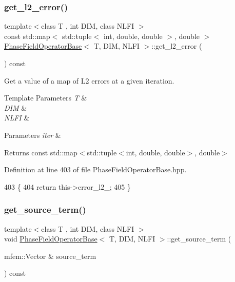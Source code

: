 \subsubsection{\texorpdfstring{get\+\_\+l2\+\_\+error()}{get\_l2\_error()}}
{\footnotesize\ttfamily template$<$class T , int D\+IM, class N\+L\+FI $>$ \\
const std\+::map$<$ std\+::tuple$<$ int, double, double $>$, double $>$ \hyperlink{classPhaseFieldOperatorBase}{Phase\+Field\+Operator\+Base}$<$ T, D\+IM, N\+L\+FI $>$\+::get\+\_\+l2\+\_\+error (\begin{DoxyParamCaption}{ }\end{DoxyParamCaption}) const\hspace{0.3cm}{\ttfamily [inherited]}}



Get a value of a map of L2 errors at a given iteration. 


\begin{DoxyTemplParams}{Template Parameters}
{\em T} & \\
\hline
{\em D\+IM} & \\
\hline
{\em N\+L\+FI} & \\
\hline
\end{DoxyTemplParams}

\begin{DoxyParams}{Parameters}
{\em iter} & \\
\hline
\end{DoxyParams}
\begin{DoxyReturn}{Returns}
const std\+::map$<$std\+::tuple$<$int, double, double$>$, double$>$ 
\end{DoxyReturn}


Definition at line 403 of file Phase\+Field\+Operator\+Base.\+hpp.


\begin{DoxyCode}
403                                                          \{
404   \textcolor{keywordflow}{return} this->error\_l2\_;
405 \}
\end{DoxyCode}
\mbox{\label{classPhaseFieldOperatorBase_ade4aaf43e627fdc8b2a3690839e225d3}} 
\subsubsection{\texorpdfstring{get\+\_\+source\+\_\+term()}{get\_source\_term()}}
{\footnotesize\ttfamily template$<$class T , int D\+IM, class N\+L\+FI $>$ \\
void \hyperlink{classPhaseFieldOperatorBase}{Phase\+Field\+Operator\+Base}$<$ T, D\+IM, N\+L\+FI $>$\+::get\+\_\+source\+\_\+term (\begin{DoxyParamCaption}\item[{mfem\+::\+Vector \&}]{source\+\_\+term }\end{DoxyParamCaption}) const\hspace{0.3cm}{\ttfamily [inherited]}}



